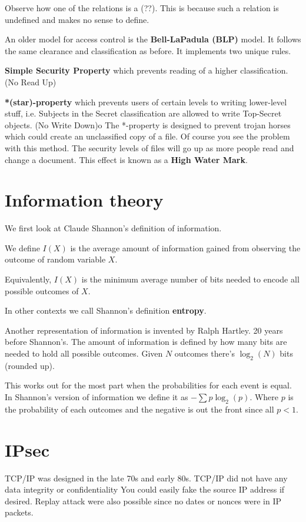 \documentclass{report}
\begin{document}
Observe how one of the relations is a (??). This is because such a relation is
undefined and makes no sense to define.

An older model for access control is the \textbf{Bell-LaPadula (BLP)} model.
It follows the same clearance and classification as before. It implements two
unique rules.

\textbf{Simple Security Property} which prevents reading of a higher 
classification. (No Read Up)

\textbf{*(star)-property}
which prevents users of certain levels to writing lower-level
stuff,
i.e. Subjects in the Secret classification are allowed to write Top-Secret
objects. (No Write Down)o
The *-property is designed to prevent trojan horses which could create an
unclassified copy of a file.
Of course you see the problem with this method. The security levels of files
will go up as more people read and change a document. This effect is known
as a \textbf{High Water Mark}.

\section{Information theory}
We first look at Claude Shannon's definition of information.

We define $I(X)$ is the average amount of information gained from observing
the outcome of random variable $X$.

Equivalently, $I(X)$ is the minimum average number of bits needed to encode all
possible outcomes of $X$.

In other contexts we call Shannon's definition \textbf{entropy}.

Another representation of information is invented by Ralph Hartley. 20 years
before Shannon's. The amount of information is defined by how many bits are
needed to hold all possible outcomes. Given $N$ outcomes there's $\log_2(N)$
bits (rounded up).

This works out for the most part when the probabilities for each event is equal.
In Shannon's version of information we define it as $-\sum p\log_2(p)$. Where
$p$ is the probability of each outcomes and the negative is out the front since
all $p < 1$.

\section{IPsec}
TCP/IP was designed in the late 70s and early 80s.
TCP/IP did not have any data integrity or confidentiality
You could easily fake the source IP address if desired.
Replay attack were also possible since no dates or nonces were in IP packets.
\end{document}
